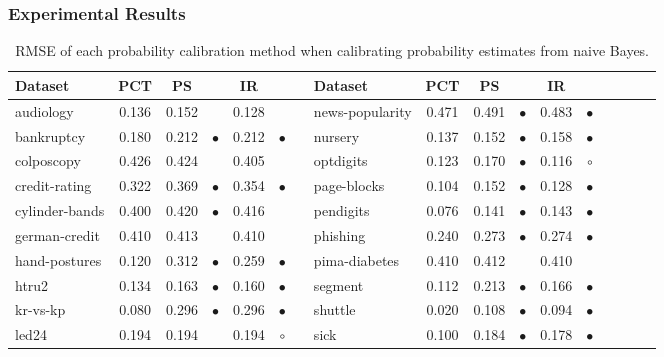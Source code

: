 \documentclass[wcp]{jmlr}
\begin{document}
\subsubsection{Experimental Results}
\begin{table}[t]
\caption{\label{tab:naive_bayes}RMSE of each probability calibration method when calibrating probability estimates from naive Bayes.}
\footnotesize
{\centering \begin{tabular}{lcc@{\hspace{0.1cm}}cc@{\hspace{0.1cm}}cclcc@{\hspace{0.1cm}}cc@{\hspace{0.1cm}}cc@{\hspace{0.1cm}}cr@{\hspace{0.1cm}}c}
\toprule
Dataset 		& PCT  & PS     &           & IR    & 			& & Dataset 		& PCT   & PS    &           & IR    & 		 \\
\midrule
audiology       & 0.136 & 0.152 &           & 0.128 &           & & news-popularity & 0.471 & 0.491 & $\bullet$ & 0.483 & $\bullet$\\
bankruptcy      & 0.180 & 0.212 & $\bullet$ & 0.212 & $\bullet$ & & nursery         & 0.137 & 0.152 & $\bullet$ & 0.158 & $\bullet$\\
colposcopy      & 0.426 & 0.424 &           & 0.405 &           & & optdigits       & 0.123 & 0.170 & $\bullet$ & 0.116 & $\circ$  \\
credit-rating   & 0.322 & 0.369 & $\bullet$ & 0.354 & $\bullet$ & & page-blocks     & 0.104 & 0.152 & $\bullet$ & 0.128 & $\bullet$\\
cylinder-bands  & 0.400 & 0.420 & $\bullet$ & 0.416 &           & & pendigits       & 0.076 & 0.141 & $\bullet$ & 0.143 & $\bullet$\\
german-credit   & 0.410 & 0.413 &           & 0.410 &           & & phishing        & 0.240 & 0.273 & $\bullet$ & 0.274 & $\bullet$\\
hand-postures   & 0.120 & 0.312 & $\bullet$ & 0.259 & $\bullet$ & & pima-diabetes   & 0.410 & 0.412 &           & 0.410 &          \\
htru2           & 0.134 & 0.163 & $\bullet$ & 0.160 & $\bullet$ & & segment         & 0.112 & 0.213 & $\bullet$ & 0.166 & $\bullet$\\
kr-vs-kp        & 0.080 & 0.296 & $\bullet$ & 0.296 & $\bullet$ & & shuttle         & 0.020 & 0.108 & $\bullet$ & 0.094 & $\bullet$\\
led24           & 0.194 & 0.194 &           & 0.194 & $\circ$   & & sick            & 0.100 & 0.184 & $\bullet$ & 0.178 & $\bullet$\\

\end{tabular}}
\end{table}
\end{document}
